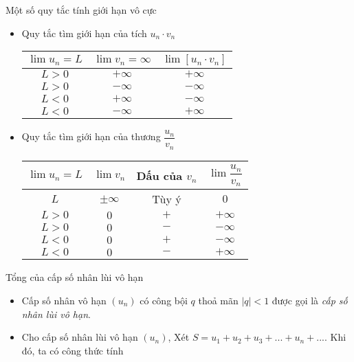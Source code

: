 \begin{dang}{Một số quy tắc tính giới hạn vô cực}
	\begin{itemize}
		\item [\ding{172}] Quy tắc tìm giới hạn của tích $u_n\cdot v_n$
		\begin{center}
			\begin{tabular}{|c|c|c|}
				\hline
				$\lim u_n=L$ & $\lim v_n = \infty$   & $\lim \left[{u_n\cdot v_n}\right]$ \\
				\hline
				$L>0$   & $+\infty $   & $+\infty $ \\
				\hline
				$L>0$    & $-\infty $    & $-\infty $ \\
				\hline
				$L<0$   & $+\infty $   & $-\infty $ \\
				\hline
				$L<0$    & $-\infty $    & $+\infty $ \\
				\hline
			\end{tabular}
		\end{center}
		\item [\ding{173}]Quy tắc tìm giới hạn của thương $\dfrac{u_n}{v_n}$
		\begin{center}
			\begin{tabular}{|c|c|c|c|}
				\hline
				$\lim u_n=L$ & $\lim v_n$   & Dấu của $v_n$ & $\lim \dfrac{u_n}{v_n}$\\
				\hline
				$L$   & $\pm \infty $   & Tùy ý & $0$\\
				\hline
				$L>0$   & $0$   & $+$ & $+\infty $\\
				\hline
				$L>0$    & $0$   & $-$ & $-\infty $\\
				\hline
				$L<0$   & $0$   & $+$ & $-\infty $\\
				\hline
				$L<0$    & $0$    & $-$ & $+\infty $\\
				\hline
			\end{tabular}
		\end{center}  
	\end{itemize}
	
\end{dang}

\begin{dang}{Tổng của cấp số nhân lùi vô hạn}
	\begin{itemize}
		\item [\iconMT] Cấp số nhân vô hạn $(u_n)$ có công bội $q$ thoả mãn $|q|<1$ được gọi là \textit{cấp số nhân lùi vô hạn}.
		\item [\iconMT] Cho cấp số nhân lùi vô hạn $(u_n)$, Xét $S=u_1+u_2+u_3+...+u_n+...$. Khi đó, ta có công thức tính  
	\end{itemize}
\end{dang}